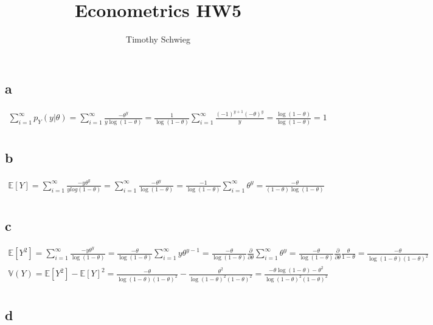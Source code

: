 \documentclass[10pt]{paper}\usepackage[]{graphicx}\usepackage[]{color}
\title{Econometrics HW5}
\author{Timothy Schwieg}
\begin{document}
\maketitle
\subsection*{a}


\begin{align*}
  \sum_{i=1}^\infty p_Y(y | \theta ) = \sum_{i=1}^\infty \frac{- \theta^y}{y \log( 1 - \theta)} = \frac{1 }{\log( 1- \theta)} \sum_{i=1}^\infty \frac{(-1)^{y+1} (-\theta)^y}{y} = \frac{\log(1-\theta)}{\log(1-\theta)} = 1\\
\end{align*}

\subsection*{b}

\begin{align*}
  \mathbb{E}[Y] = \sum_{i=1}^\infty \frac{- y \theta^y}{y log( 1 - \theta)} = \sum_{i=1}^\infty \frac{-\theta^y}{\log(1-\theta)} = \frac{-1}{\log(1-\theta)}\sum_{i=1}^\infty \theta^y = \frac{-\theta}{(1-\theta) \log( 1- \theta)}\\
\end{align*}

\subsection*{c}

\begin{align*}
  \mathbb{E}[Y^2] = \sum_{i=1}^\infty \frac{-y \theta^y}{\log(1-\theta)} = \frac{- \theta}{\log(1-\theta)} \sum_{i=1}^\infty y \theta^{y-1}
  = \frac{- \theta}{\log( 1- \theta)} \frac{\partial}{\partial \theta} \sum_{i=1}^\infty \theta^y = \frac{-\theta}{\log(1-\theta)} \frac{\partial}{\partial \theta} \frac{\theta}{1-\theta} = \frac{- \theta}{\log(1-\theta) (1-\theta)^2}\\
  \mathbb{V}(Y) = \mathbb{E}[Y^2] - \mathbb{E}[Y]^2 = \frac{- \theta}{\log(1-\theta) (1-\theta)^2} - \frac{\theta^2}{\log(1-\theta)^2 (1-\theta)^2} = \frac{- \theta \log( 1- \theta) - \theta^2}{\log(1-\theta)^2 (1-\theta)^2}\\
\end{align*}

\subsection*{d}
\end{document}
